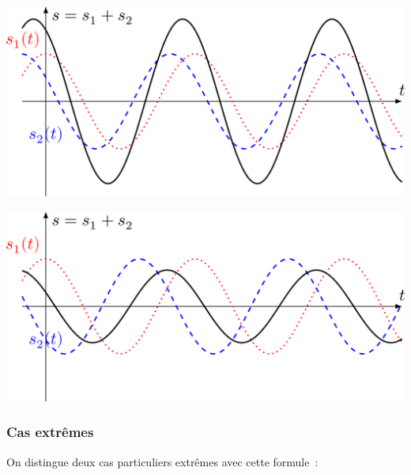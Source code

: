 \documentclass[../../main/main.tex]{subfiles}
\begin{document}
\begin{tcb}
	\begin{minipage}{0.45\linewidth}
		\begin{center}
			\includegraphics[width=\linewidth]{somme_pi3}
			\label{fig:sommepi3}
		\end{center}
	\end{minipage}
	\hfill
	\begin{minipage}{0.45\linewidth}
		\begin{center}
			\includegraphics[width=\linewidth]{somme_3pi4}
			\label{fig:somme3pi4}
		\end{center}
	\end{minipage}
\end{tcb}

\vspace{-10pt}
\subsubsection{Cas extrêmes}
On distingue deux cas particuliers extrêmes avec cette formule~:
\end{document}
